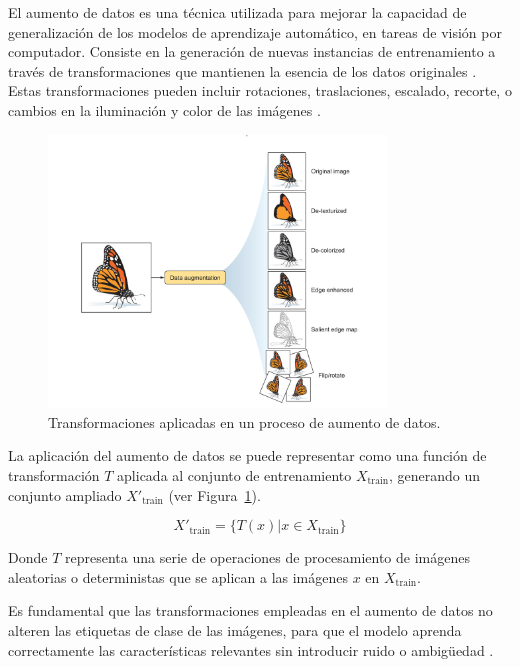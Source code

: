 El aumento de datos es una técnica utilizada para mejorar la capacidad de generalización de los modelos de aprendizaje automático, en tareas de visión por computador. Consiste en la generación de nuevas instancias de entrenamiento a través de transformaciones que mantienen la esencia de los datos originales \cite{geron2019hands}. Estas transformaciones pueden incluir rotaciones, traslaciones, escalado, recorte, o cambios en la iluminación y color de las imágenes \cite{elgendy2020deep}.

\begin{figure}[H]
    \begin{center}
        \includegraphics[width=0.8\textwidth]{Images/DataAumentation.png}
    \end{center}
    \caption{Transformaciones aplicadas en un proceso de aumento de datos.}
    \label{fig:DataAumentation}
\end{figure}

La aplicación del aumento de datos se puede representar como una función de transformación \( T \) aplicada al conjunto de entrenamiento \( X_{\text{train}} \), generando un conjunto ampliado \( X'_{\text{train}} \) (ver Figura~\ref{fig:DataAumentation}).

\begin{equation}
    X'_{\text{train}} = \{ T(x) | x \in X_{\text{train}} \}
\end{equation}

Donde \( T \) representa una serie de operaciones de procesamiento de imágenes aleatorias o deterministas que se aplican a las imágenes \( x \) en \( X_{\text{train}} \).

Es fundamental que las transformaciones empleadas en el aumento de datos no alteren las etiquetas de clase de las imágenes, para que el modelo aprenda correctamente las características relevantes sin introducir ruido o ambigüedad \cite{aghdam2017guide}.

